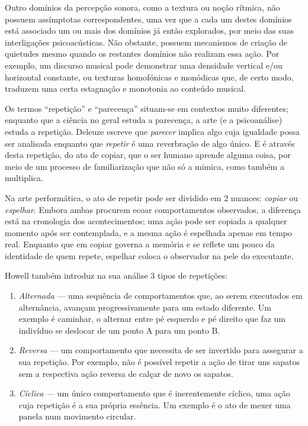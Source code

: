 \documentclass[../main.tex]{subfiles}
\begin{document}

Outro domínios da percepção sonora, como a textura ou noção rítmica, não possuem assímptotas correspondentes, uma vez que a cada um destes domínios está associado um ou mais dos domínios já então explorados, por meio das suas interligações psicoacústicas. Não obstante, possuem mecanismos de criação de quietudes mesmo quando os restantes domínios não realizam essa ação. Por exemplo, um discurso musical pode demonstrar uma densidade vertical e/ou horizontal constante, ou texturas homofónicas e monódicas que, de certo modo, traduzem uma certa estagnação e monotonia ao conteúdo musical.


Os termos \enquote{repetição} e \enquote{parecença} situam-se em contextos muito diferentes; enquanto que a ciência no geral estuda a parecença, a arte (e a psicoanálise) estuda a repetição. Deleuze escreve que \textsl{parecer} implica algo cuja igualdade possa ser analisada enquanto que \textsl{repetir} é uma reverbração de algo único\cite{deleuze}. E é através desta repetição, do ato de copiar, que o ser humano aprende alguma coisa, por meio de um processo de familiarização que não só a mimica, como também a multiplica\cite{howell1999}.

Na arte performática, o ato de repetir pode ser dividido em 2 nuances: \textsl{copiar} ou \textsl{espelhar}. Embora ambas procurem ecoar comportamentos observados, a diferença está na cronologia dos acontecimentos; uma ação pode ser copiada a qualquer momento após ser contemplada, e a mesma ação é espelhada apenas em tempo real. Enquanto que em copiar governa a memória e se reflete um pouco da identidade de quem repete, espelhar coloca o observador na pele do executante.

Howell também introduz na sua análise 3 tipos de repetições:
\begin{enumerate}
    \item \textsl{Alternada} — uma sequência de comportamentos que, ao serem executados em alternância, avançam progressivamente para um estado diferente. Um exemplo é caminhar, o alternar entre pé esquerdo e pé direito que faz um indivíduo se deslocar de um ponto A para um ponto B.
    \item \textsl{Reversa} — um comportamento que necessita de ser invertido para assegurar a sua repetição. Por exemplo, não é possível repetir a ação de tirar uns sapatos sem a respectiva ação reversa de calçar de novo os sapatos.
    \item \textsl{Cíclica} — um único comportamento que é inerentemente cíclico, uma ação cuja repetição é a sua própria essência. Um exemplo é o ato de mexer uma panela num movimento circular.
\end{enumerate}
\end{document}
